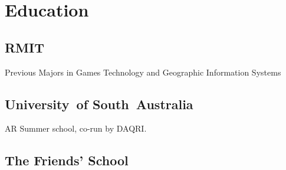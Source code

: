 \documentclass[a4paper]{deedy-resume} %
\begin{document}
\begin{minipage}[t]{0.33\textwidth} %



\section{Education}

\subsection{RMIT}

Previous Majors in Games Technology and Geographic Information Systems \\

\sectionspace %

\subsection{University\hbox{ }of South~Australia}

AR Summer school, co-run by DAQRI. \\

\sectionspace %


\subsection{The Friends' School}



\end{minipage}
\end{document}
